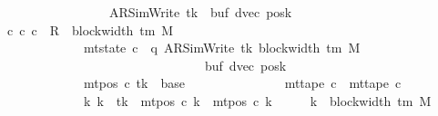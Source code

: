 \begin{isabellebody}
\ \ \ \ \ \ \ \ \ \ \ \ \ \ \ \ \ \ \ {\isacharparenleft}{\kern0pt}AR{\isacharunderscore}{\kern0pt}SimWrite{\isacharcomma}{\kern0pt}\ tk{\isacharcomma}{\kern0pt}\ {}{\isacharcomma}{\kern0pt}\ buf{\isacharcomma}{\kern0pt}\ dvec{\isacharcomma}{\kern0pt}\ posk{\isacharparenright}{\kern0pt}{\isachardoublequoteclose}\isanewline
\ \ \ {\isachardoublequoteopen}{\isasymexists}c{\isacharprime}{\kern0pt}{\isachardot}{\kern0pt}\ {\isacharparenleft}{\kern0pt}c{}{\isacharcomma}{\kern0pt}\ c{\isacharprime}{\kern0pt}{\isacharparenright}{\kern0pt}\ {\isasymin}\ R{\isacharprime}{\kern0pt}\ {\isacharcircum}{\kern0pt}{\isacharcircum}{\kern0pt}\ block{\isacharunderscore}{\kern0pt}width\ {\isacharparenleft}{\kern0pt}{\isasymGamma}{\isacharunderscore}{\kern0pt}tm\ M{\isacharparenright}{\kern0pt}\isanewline
\ \ \ \ \ \ \ \ \ \ \ \ \ \ {\isasymand}\ mt{\isacharunderscore}{\kern0pt}state\ c{\isacharprime}{\kern0pt}\ {\isacharequal}{\kern0pt}\ {\isacharparenleft}{\kern0pt}q{\isacharcomma}{\kern0pt}\ AR{\isacharunderscore}{\kern0pt}SimWrite{\isacharcomma}{\kern0pt}\ tk{\isacharcomma}{\kern0pt}\ block{\isacharunderscore}{\kern0pt}width\ {\isacharparenleft}{\kern0pt}{\isasymGamma}{\isacharunderscore}{\kern0pt}tm\ M{\isacharparenright}{\kern0pt}{\isacharcomma}{\kern0pt}\isanewline
\ \ \ \ \ \ \ \ \ \ \ \ \ \ \ \ \ \ \ \ \ \ \ \ \ \ \ \ \ \ \ \ \ \ buf{\isacharcomma}{\kern0pt}\ dvec{\isacharcomma}{\kern0pt}\ posk{\isacharparenright}{\kern0pt}\isanewline
\ \ \ \ \ \ \ \ \ \ \ \ \ \ {\isasymand}\ mt{\isacharunderscore}{\kern0pt}pos\ c{\isacharprime}{\kern0pt}\ tk\ {\isacharequal}{\kern0pt}\ base\isanewline
\ \ \ \ \ \ \ \ \ \ \ \ \ \ {\isasymand}\ mt{\isacharunderscore}{\kern0pt}tape\ c{\isacharprime}{\kern0pt}\ {\isacharequal}{\kern0pt}\ mt{\isacharunderscore}{\kern0pt}tape\ c{}\isanewline
\ \ \ \ \ \ \ \ \ \ \ \ \ \ {\isasymand}\ {\isacharparenleft}{\kern0pt}{\isasymforall}k{\isacharprime}{\kern0pt}{\isachardot}{\kern0pt}\ k{\isacharprime}{\kern0pt}\ {\isasymnoteq}\ tk\ {\isasymlongrightarrow}\ mt{\isacharunderscore}{\kern0pt}pos\ c{\isacharprime}{\kern0pt}\ k{\isacharprime}{\kern0pt}\ {\isacharequal}{\kern0pt}\ mt{\isacharunderscore}{\kern0pt}pos\ c{}\ k{\isacharprime}{\kern0pt}{\isacharparenright}{\kern0pt}{\isachardoublequoteclose}\isanewline
%
\isadelimproof
%
\endisadelimproof
%
\isatagproof
{}\isamarkupfalse%
\ {\isacharminus}{\kern0pt}\isanewline
\ \ \isamarkupfalse%
\ {\isacharquery}{\kern0pt}k\ {\isacharequal}{\kern0pt}\ {\isachardoublequoteopen}block{\isacharunderscore}{\kern0pt}width\ {\isacharparenleft}{\kern0pt}{\isasymGamma}{\isacharunderscore}{\kern0pt}tm\ M{\isacharparenright}{\kern0pt}{\isachardoublequoteclose}\isanewline

\end{isabellebody}
